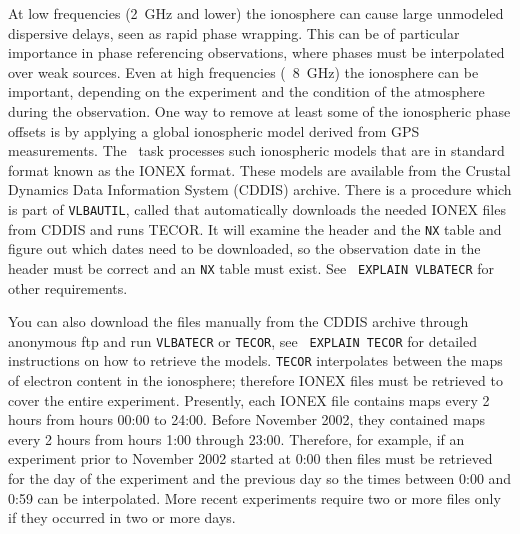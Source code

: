 
At low frequencies (2~GHz and lower) the ionosphere can cause large
unmodeled dispersive delays, seen as rapid phase wrapping.  This can
be of particular importance in phase referencing observations, where
phases must be interpolated over weak sources.  Even at high
frequencies (\eg\ 8~GHz) the ionosphere can be important, depending on
the experiment and the condition of the atmosphere during the
observation.  One way to remove at least some of the ionospheric phase
offsets is by applying a global ionospheric model derived from GPS
measurements.  The \AIPS\ task {\tt {}} processes such
ionospheric models that are in standard format known as the IONEX
format.  These models are available from the Crustal Dynamics Data
Information System (CDDIS) archive.  There is a procedure
which is part of {\tt VLBAUTIL}, called {\tt {}} that
automatically downloads the needed IONEX files from CDDIS and runs
TECOR.  It will examine the header and the {\tt NX} table and figure
out which dates need to be downloaded, so the observation date in the
header must be correct and an {\tt NX} table must exist.  See {\tt
EXPLAIN VLBATECR} for other requirements.


You can also download the files manually from the CDDIS archive
through anonymous ftp and run {\tt VLBATECR} or {\tt TECOR}, see {\tt
EXPLAIN TECOR} for detailed instructions on how to retrieve the
models.  {\tt TECOR} interpolates between the maps of electron content
in the ionosphere; therefore IONEX files must be retrieved to cover
the entire experiment.  Presently, each IONEX file contains maps every
2 hours from hours 00:00 to 24:00.  Before November 2002, they
contained maps every 2 hours from hours 1:00 through 23:00.
Therefore, for example, if an experiment prior to November 2002
started at 0:00 then files must be retrieved for the day of the
experiment and the previous day so the times between 0:00 and 0:59 can
be interpolated.  More recent experiments require two or more files
only if they occurred in two or more days.


